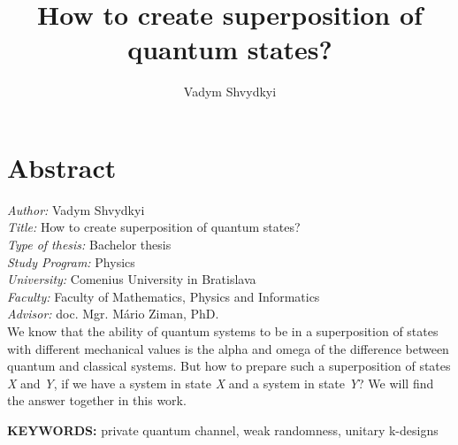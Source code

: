 \documentclass[english,14pt,a4paper]{article}
\title{How to create superposition of quantum states?}
\author{Vadym Shvydkyi}
\begin{document}
	\maketitle
	\pagebreak
	\section*{Abstract}
	\begin{spacing}{1.5}
	\textit{Author:} Vadym Shvydkyi \\
	\textit{Title:} How to create superposition of quantum states? \\
	\textit{Type of thesis:} Bachelor thesis \\
	\textit{Study Program:} Physics \\
	\textit{University:} Comenius University in Bratislava \\
	\textit{Faculty:} Faculty of Mathematics, Physics and Informatics \\
	\textit{Advisor:} doc. Mgr. Mário Ziman, PhD. \\
	
	We know that the ability of quantum systems to be in a superposition of states with different mechanical values is the alpha and omega of the difference between quantum and classical systems. But how to prepare such a superposition of states \textit{X} and \textit{Y}, if we have a system in state \textit{X} and a system in state \textit{Y}? We will find the answer together in this work.
	
	\textbf{KEYWORDS:} private quantum channel, weak randomness, unitary k-designs
	\pagebreak
	\end{spacing}
	\pagebreak
\end{document}
